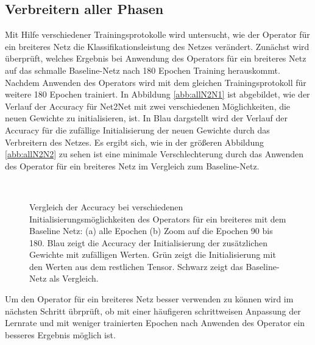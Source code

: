 \subsection{Verbreitern aller Phasen}
Mit Hilfe verschiedener Trainingsprotokolle wird untersucht, wie der Operator für ein breiteres Netz die Klassifikationsleistung des Netzes verändert.
Zunächst wird überprüft, welches Ergebnis bei Anwendung des Operators für ein breiteres Netz auf das schmalle Baseline-Netz nach 180 Epochen Training herauskommt. Nachdem Anwenden des Operators wird mit dem gleichen Trainingsprotokoll für weitere 180 Epochen trainiert. In Abbildung \ref{abb:allN2N1} ist abgebildet, wie der Verlauf der Accuracy für Net2Net mit zwei verschiedenen Möglichkeiten, die neuen Gewichte zu initialisieren, ist. In Blau dargstellt wird der Verlauf der Accuracy für die zufällige Initialisierung der neuen Gewichte durch das Verbreitern des Netzes.
Es ergibt sich, wie in der größeren Abbildung \ref{abb:allN2N2} zu sehen ist eine minimale Verschlechterung durch das Anwenden des Operator für ein breiteres Netz im Vergleich zum Baseline-Netz.
 \begin{figure}
     \centering
     \hfill
     \\
     \caption{Vergleich der Accuracy bei verschiedenen Initialisierungsmöglichkeiten des Operators für ein breiteres mit dem Baseline Netz: (a) alle Epochen (b) Zoom auf die Epochen 90 bis 180. Blau zeigt die Accuracy der Initialisierung der zusätzlichen Gewichte mit zufälligen Werten. Grün zeigt die Initialisierung mit den Werten aus dem restlichen Tensor. Schwarz zeigt das Baseline-Netz als Vergleich.}
     \label{abb:memory}
\end{figure}
Um den Operator für ein breiteres Netz besser verwenden zu können wird im nächsten Schritt übrprüft, ob mit einer häufigeren schrittweisen Anpassung der Lernrate und mit weniger trainierten Epochen nach Anwenden des Operator ein besseres Ergebnis möglich ist.

